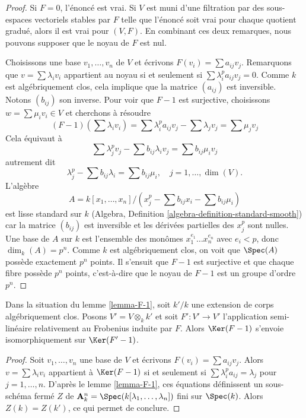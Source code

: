 \begin{proof}
Si $F = 0$, l'\'enonc\'e est vrai. Si $V$ est muni d'une filtration par des
sous-espaces vectoriels stables par $F$ telle que l'\'enonc\'e soit vrai pour chaque
quotient gradu\'e, alors il est vrai pour $(V, F)$. En combinant ces deux remarques,
nous pouvons supposer que le noyau de $F$ est nul.

\medskip\noindent
Choisissons une base $v_1, \ldots, v_n$ de $V$ et \'ecrivons
$F(v_i) = \sum a_{ij} v_j$. Remarquons que $v = \sum \lambda_i v_i$
appartient au noyau si et seulement si $\sum \lambda_i^p a_{ij} v_j = 0$.
Comme $k$ est alg\'ebriquement clos, cela implique que la matrice $(a_{ij})$
est inversible. Notons $(b_{ij})$ son inverse. Pour voir que $F - 1$
est surjective, choisissons $w = \sum \mu_i v_i \in V$ et cherchons \`a r\'esoudre
$$
(F - 1)(\sum \lambda_iv_i) =
\sum \lambda_i^p a_{ij} v_j - \sum \lambda_j v_j = \sum \mu_j v_j
$$
Cela \'equivaut \`a
$$
\sum \lambda_j^p v_j - \sum b_{ij} \lambda_i v_j = \sum b_{ij} \mu_i v_j
$$
autrement dit
$$
\lambda_j^p - \sum b_{ij} \lambda_i = \sum b_{ij} \mu_i,
\quad j = 1, \ldots, \dim(V).
$$
L'alg\`ebre
$$
A = k[x_1, \ldots, x_n]/
(x_j^p - \sum b_{ij} x_i - \sum b_{ij} \mu_i)
$$
est lisse standard sur $k$
(Algebra, Definition \ref{algebra-definition-standard-smooth})
car la matrice $(b_{ij})$ est inversible et les d\'eriv\'ees partielles
des $x_j^p$ sont nulles. Une base de $A$ sur $k$ est l'ensemble des mon\^omes
$x_1^{e_1} \ldots x_n^{e_n}$ avec $e_i < p$, donc $\dim_k(A) = p^n$.
Comme $k$ est alg\'ebriquement clos, on voit que $\Spec(A)$ poss\`ede exactement
$p^n$ points. Il s'ensuit que $F - 1$ est surjective et que chaque fibre
poss\`ede $p^n$ points, c'est-\`a-dire que le noyau de $F - 1$ est un groupe d'ordre $p^n$.
\end{proof}

\begin{lemma}
\label{lemma-F-2}
Dans la situation du lemme \ref{lemma-F-1}, soit $k'/k$ une extension
de corps alg\'ebriquement clos. Posons $V' = V \otimes_k k'$ et soit
$F' : V' \to V'$ l'application semi-lin\'eaire relativement au Frobenius induite par $F$.
Alors $\Ker(F - 1)$ s'envoie isomorphiquement sur $\Ker(F' - 1)$.
\end{lemma}

\begin{proof}
Soit $v_1, \ldots, v_n$ une base de $V$ et \'ecrivons $F(v_i) = \sum a_{ij}v_j$.
Alors $v = \sum \lambda_i v_i$ appartient \`a $\Ker(F - 1)$ si et seulement si
$\sum \lambda_i^pa_{ij} = \lambda_j$ pour $j = 1, \ldots, n$.
D'apr\`es le lemme \ref{lemma-F-1}, ces \'equations
d\'efinissent un sous-sch\'ema ferm\'e $Z$ de
$\mathbf{A}^n_k = \Spec(k[\lambda_1, \ldots, \lambda_n])$
fini sur $\Spec(k)$. Alors $Z(k) = Z(k')$, ce qui permet de conclure.
\end{proof}

